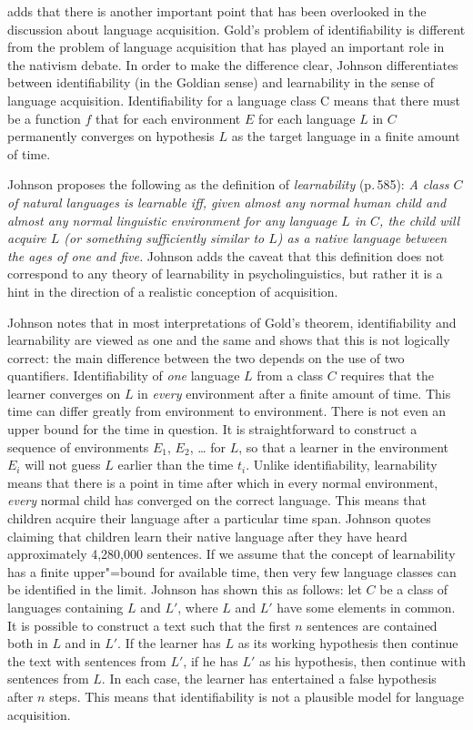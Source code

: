 \citet{Johnson2004a} adds that there is another important point that has been overlooked in the discussion about language acquisition. Gold's problem
of identifiability is different from the problem of language acquisition that has played an important role in the nativism debate.
In order to make the difference clear, Johnson differentiates between identifiability (in the Goldian sense) and learnability in the sense of
language acquisition. Identifiability for a language class C means that there must be a function $f$ that for each environment $E$ for each
language $L$ in $C$ permanently converges on hypothesis $L$ as the target language in a finite amount of time.

Johnson proposes the following as the definition of \emph{learnability} (p.\,585):
\emph{A class $C$ of natural languages is learnable iff, given almost any normal human child and almost any
normal linguistic environment for any language $L$ in $C$, the child will acquire $L$ (or something sufficiently similar to $L$) as a native language
between the ages of one and five.} Johnson adds the caveat that this definition does not correspond to
any theory of learnability in psycholinguistics, but rather it is a hint in the direction of a
realistic conception of acquisition.

Johnson notes that in most interpretations of Gold's theorem, identifiability and learnability are viewed as one and the same
and shows that this is not logically correct: the main difference between the two depends on the use of two quantifiers.
Identifiability of  \emph{one} language $L$ from a class $C$ requires that the learner converges on $L$ in \emph{every} environment
after a finite amount of time. This time can differ greatly from environment to environment.
There is not even an upper bound for the time in question.
It is straightforward to construct a sequence of environments $E_1$, $E_2$, \ldots{} for $L$, so that a learner in the environment $E_i$ will not
guess $L$ earlier than the time  $t_i$. Unlike identifiability, learnability means that there is a point in time after which in every
normal environment, \emph{every} normal child has converged on the correct language. This means that children acquire their language
after a particular time span.
 Johnson quotes \citet[]{Morgan89a} claiming that children learn their native language after they have heard approximately
 4,280,000 sentences. If we assume that the concept of learnability has a finite upper"=bound for available time, then very few language
 classes can be identified in the limit. Johnson has shown this as follows: let $C$ be a class of languages containing $L$ and $L'$, where
 $L$ and $L'$ have some elements in common. It is possible to construct a text such that the first $n$ sentences are contained both in
 $L$ and in $L'$.
If the learner has $L$ as its working hypothesis  then continue the text with sentences from $L'$, if he has $L'$ as his hypothesis,
then continue with sentences from $L$. In each case, the learner has entertained a false hypothesis after $n$ steps. This means that identifiability
is not a plausible model for language acquisition.

